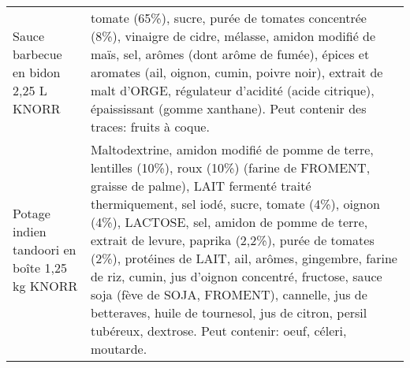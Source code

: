 \begin{longtable}{p{5cm}p{10cm}}
                                                                     Sauce barbecue en bidon 2,25 L KNORR &                                                                                                                                                                                                                                                                                                                                                                                                                                                                                                                                                                                                                                                                                             tomate (65\%), sucre, purée de tomates concentrée (8\%), vinaigre de cidre, mélasse, amidon modifié de maïs, sel, arômes (dont arôme de fumée), épices et aromates (ail, oignon, cumin, poivre noir), extrait de malt d'ORGE, régulateur d'acidité (acide citrique), épaississant (gomme xanthane).  Peut contenir des traces: fruits à coque. \\
                                                            Potage indien tandoori en boîte 1,25 kg KNORR &                                                                                                                                                                                                                                                                                                                                                                                                                                                            Maltodextrine, amidon modifié de pomme de terre, lentilles (10\%), roux (10\%) (farine de FROMENT, graisse de palme), LAIT fermenté traité thermiquement, sel iodé, sucre, tomate (4\%), oignon (4\%), LACTOSE, sel, amidon de pomme de terre, extrait de levure, paprika (2,2\%), purée de tomates (2\%), protéines de LAIT, ail, arômes, gingembre, farine de riz, cumin, jus d'oignon concentré, fructose, sauce soja (fève de SOJA, FROMENT), cannelle, jus de betteraves, huile de tournesol, jus de citron, persil tubéreux, dextrose. Peut contenir: oeuf, céleri, moutarde. \\

\end{longtable}
